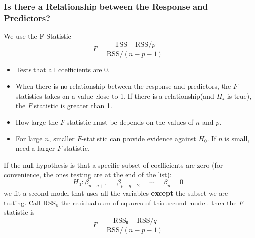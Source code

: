          \subsubsection*{Is there a Relationship between the Response and Predictors?}
         We use the F-Statistic
         \begin{equation*}\tag{3.23}
             F = \frac{\text{TSS}-\text{RSS}/p}{\text{RSS}/(n-p-1)}
          \end{equation*}
          \begin{itemize}
          	\item Tests that all coefficients are $0$.
              \item When there is no relationship between the response and predictors, the $F$-statistics takes on a value close to 1.  If there is a relationship(and $H_a$ is true), the $F$ statistic is greater than 1.
              \item How large the $F$-statistic must be depends on the values of $n$ and $p$.
              \item For large $n$, smaller $F$-statistic can provide evidence against $H_0$.  If $n$ is small, need a larger $F$-statistic.
          \end{itemize}
          If the null hypothesis is that a specific subset of coefficients are zero (for convenience, the ones testing are at the end of the list):
          \begin{equation*}
              H_0: \beta_{p-q+1} = \beta_{p-q+2} = \cdots = \beta_{p} = 0
           \end{equation*}
           we fit a second model that uses all the variables \textbf{except} the subset we are testing.  Call $\text{RSS}_0$ the residual sum of squares of this second model.  then the $F$-statistic is
           \begin{equation*}\tag{3.24}
                             F = \frac{\text{RSS}_0-\text{RSS}/q}{\text{RSS}/(n-p-1)}
           \end{equation*}

